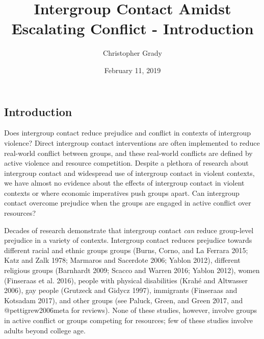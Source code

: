 \documentclass[11pt]{article}
\title{Intergroup Contact Amidst Escalating Conflict - Introduction}
\author{
Christopher Grady
}
\date{February 11, 2019}
\begin{document}
\VerbatimFootnotes

%
%
%
%
%
%
%
%
%
%

\maketitle

\subsection{Introduction}\label{introduction}

Does intergroup contact reduce prejudice and conflict in contexts of
intergroup violence? Direct intergroup contact interventions are often
implemented to reduce real-world conflict between groups, and these
real-world conflicts are defined by active violence and resource
competition. Despite a plethora of research about intergroup contact and
widespread use of intergroup contact in violent contexts, we have almost
no evidence about the effects of intergroup contact in violent contexts
or where economic imperatives push groups apart. Can intergroup contact
overcome prejudice when the groups are engaged in active conflict over
resources?

Decades of research demonstrate that intergroup contact \emph{can}
reduce group-level prejudice in a variety of contexts. Intergroup
contact reduces prejudice towards different racial and ethnic groups
groups (Burns, Corno, and La Ferrara 2015; Katz and Zalk 1978; Marmaros
and Sacerdote 2006; Yablon 2012), different religious groups (Barnhardt
2009; Scacco and Warren 2016; Yablon 2012), women (Finseraas et al.
2016), people with physical disabilities (Krahé and Altwasser 2006), gay
people (Grutzeck and Gidycz 1997), immigrants (Finseraas and Kotsadam
2017), and other groups (see Paluck, Green, and Green 2017, and
@pettigrew2006meta for reviews). None of these studies, however, involve
groups in active conflict or groups competing for resources; few of
these studies involve adults beyond college age.
\end{document}
